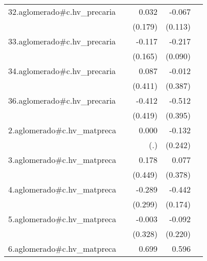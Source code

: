 {\begin{longtable}{l*{4}{D{.}{.}{-1}}}
\addlinespace
32.aglomerado#c.hv\_precaria&                     &       0.032         &      -0.067         &                     \\
            &                     &     (0.179)         &     (0.113)         &                     \\
\addlinespace
33.aglomerado#c.hv\_precaria&                     &      -0.117         &      -0.217\sym{*}  &                     \\
            &                     &     (0.165)         &     (0.090)         &                     \\
\addlinespace
34.aglomerado#c.hv\_precaria&                     &       0.087         &      -0.012         &                     \\
            &                     &     (0.411)         &     (0.387)         &                     \\
\addlinespace
36.aglomerado#c.hv\_precaria&                     &      -0.412         &      -0.512         &                     \\
            &                     &     (0.419)         &     (0.395)         &                     \\
\addlinespace
2.aglomerado#c.hv\_matpreca&                     &       0.000         &      -0.132         &                     \\
            &                     &         (.)         &     (0.242)         &                     \\
\addlinespace
3.aglomerado#c.hv\_matpreca&                     &       0.178         &       0.077         &                     \\
            &                     &     (0.449)         &     (0.378)         &                     \\
\addlinespace
4.aglomerado#c.hv\_matpreca&                     &      -0.289         &      -0.442\sym{*}  &                     \\
            &                     &     (0.299)         &     (0.174)         &                     \\
\addlinespace
5.aglomerado#c.hv\_matpreca&                     &      -0.003         &      -0.092         &                     \\
            &                     &     (0.328)         &     (0.220)         &                     \\
\addlinespace
6.aglomerado#c.hv\_matpreca&                     &       0.699\sym{*}  &       0.596\sym{*}  &                     \\

\end{longtable}}
